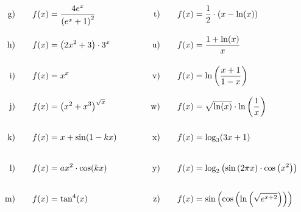 \begin{exercise}
\begin{alignat*}{5}
        \text{g)\vstrut}&\quad & \xcg & \quad&\quad & \text{t)\vstrut}&\quad & \xct \\
        \text{h)\vstrut}&\quad & \xch & \quad&\quad & \text{u)\vstrut}&\quad & \xcu \\
        \text{i)\vstrut}&\quad & \xci & \quad&\quad & \text{v)\vstrut}&\quad & \xcv \\
        \text{j)\vstrut}&\quad & \xcj & \quad&\quad & \text{w)\vstrut}&\quad & \xcw \\
        \text{k)\vstrut}&\quad & \xck & \quad&\quad & \text{x)\vstrut}&\quad & \xcx \\
        \text{l)\vstrut}&\quad & \xcl & \quad&\quad & \text{y)\vstrut}&\quad & \xcy \\
        \text{m)\vstrut}&\quad & \xcm & \quad&\quad & \text{z)\vstrut}&\quad & \xcz
      \end{alignat*}
    \endgroup
  \fi
\end{exercise}
